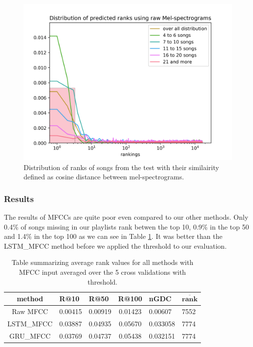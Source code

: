 \begin{figure}[h]
    \centering
	\includegraphics[width=120mm]{./img/mel_graph.png}
	\caption{Distribution of ranks of songs from the test with their similairity defined as cosine distance between mel-spectrograms.}
	\label{fig:mel_graph}
\end{figure}


\subsubsection{Results}

The results of MFCCs are quite poor even compared to our other methods. Only 0.4\% of songs missing in our playlists rank betwen the top 10, 0.9\% in the top 50 and 1.4\% in the top 100 as we can see in Table \ref{table:mfcc_methods}. It was better than the LSTM\_MFCC method before we applied the threshold to our evaluation.
\begin{table}[h]
\centering
\renewcommand{\arraystretch}{1.5}
\begin{tabu} to 1\textwidth { | c || X[c] | X[c] | c | X[c] | X[c] |}
 \hline
 \textbf{method} & \textbf{R@10} & \textbf{R@50} & \textbf{R@100} & \textbf{nGDC} & $ \boldsymbol{\overline{rank}} $ \\
 \hline
 \hline
 Raw MFCC & 0.00415 & 0.00919 & 0.01423 & 0.00607 &  7552 \\
 \hline
 LSTM\_MFCC & 0.03887 & 0.04935 & 0.05670 & 0.033058 & 7774 \\
 \hline
 GRU\_MFCC & 0.03769 & 0.04737 & 0.05438 & 0.032151 & 7774 \\
 \hline
\end{tabu} \\

\caption{Table summarizing average rank values for all methods with MFCC input averaged over the 5 cross validations with threshold.}
\label{table:mfcc_methods}
\end{table}

